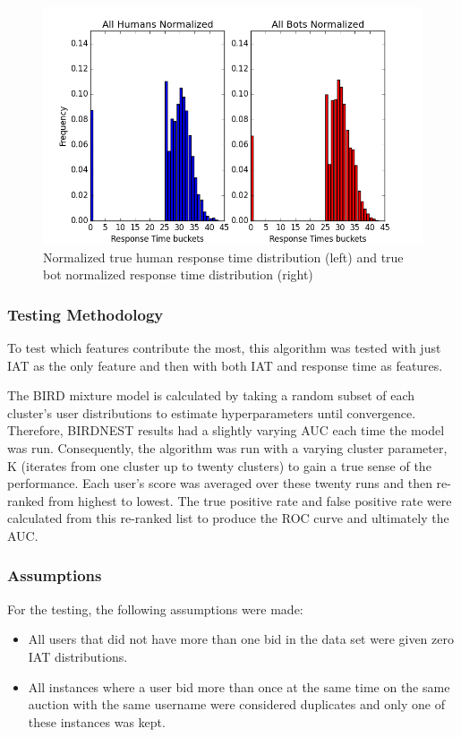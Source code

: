 \documentclass{article} %
\begin{document}
\begin{figure}[!htb]
\centering
{\caption{Normalized true human response time distribution (left) and true bot normalized response time distribution (right)} \includegraphics[scale=0.5]{img/bird_res_dist.png}}
\end{figure}

\subsubsection{Testing Methodology}

To test which features contribute the most, this algorithm was tested with just IAT as the only feature and then with both IAT and response time as features.

The BIRD mixture model is calculated by taking a random subset of each cluster's user distributions to estimate hyperparameters until convergence. Therefore, BIRDNEST results had a slightly varying AUC each time the model was run. Consequently, the algorithm was run with a varying cluster parameter, K (iterates from one cluster up to twenty clusters) to gain a true sense of the performance. Each user's score was averaged over these twenty runs and then re-ranked from highest to lowest. The true positive rate and false positive rate were calculated from this re-ranked list to produce the ROC curve and ultimately the AUC.

\subsubsection{Assumptions}

For the testing, the following assumptions were made:
\begin{itemize}
\item All users that did not have more than one bid in the data set were given zero IAT distributions.
\item All instances where a user bid more than once at the same time on the same auction with the same username were considered duplicates and only one of these instances was kept.
\end{itemize}
\end{document}
